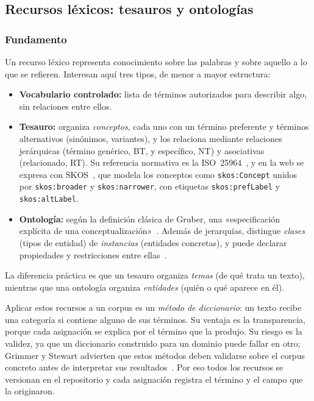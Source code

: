 \documentclass[10pt,twocolumn]{article}
\begin{document}
\subsection{Recursos léxicos: tesauros y ontologías}

\subsubsection*{Fundamento}

Un recurso léxico representa conocimiento sobre las palabras y sobre aquello
a lo que se refieren. Interesan aquí tres tipos, de menor a mayor estructura:

\begin{itemize}
\item \textbf{Vocabulario controlado:} lista de términos autorizados para
describir algo, sin relaciones entre ellos.
\item \textbf{Tesauro:} organiza \emph{conceptos}, cada uno con un término
preferente y términos alternativos (sinónimos, variantes), y los relaciona
mediante relaciones jerárquicas (término genérico, BT, y específico, NT) y
asociativas (relacionado, RT). Su referencia normativa es la
ISO~25964~\cite{iso25964}, y en la web se expresa con
SKOS~\cite{skos2009}, que modela los conceptos como
\texttt{skos:Concept} unidos por \texttt{skos:broader} y
\texttt{skos:narrower}, con etiquetas \texttt{skos:prefLabel} y
\texttt{skos:altLabel}.
\item \textbf{Ontología:} según la definición clásica de Gruber, una
«especificación explícita de una conceptualización»~\cite{gruber1993}. Además
de jerarquías, distingue \emph{clases} (tipos de entidad) de \emph{instancias}
(entidades concretas), y puede declarar propiedades y restricciones entre
ellas~\cite{noy2001}.
\end{itemize}

La diferencia práctica es que un tesauro organiza \emph{temas} (de qué trata
un texto), mientras que una ontología organiza \emph{entidades} (quién o qué
aparece en él).

Aplicar estos recursos a un corpus es un \emph{método de diccionario}: un
texto recibe una categoría si contiene alguno de sus términos. Su ventaja es la
transparencia, porque cada asignación se explica por el término que la produjo.
Su riesgo es la validez, ya que un diccionario construido para un dominio puede
fallar en otro; Grimmer y Stewart advierten que estos métodos deben validarse
sobre el corpus concreto antes de interpretar sus resultados~\cite{grimmer2013}.
Por eso todos los recursos se versionan en el repositorio y cada asignación
registra el término y el campo que la originaron.
\end{document}
